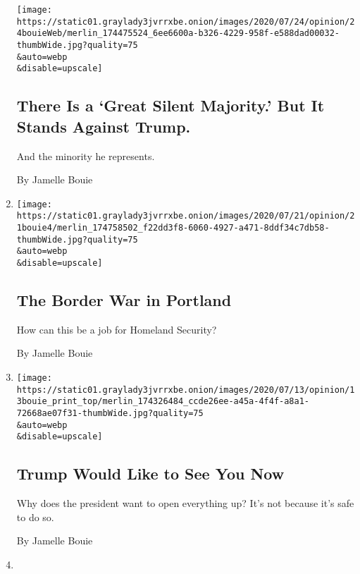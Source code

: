 \begin{enumerate}
  \texttt{[image: https://static01.graylady3jvrrxbe.onion/images/2020/07/24/opinion/24bouieWeb/merlin\_174475524\_6ee6600a-b326-4229-958f-e588dad00032-thumbWide.jpg?quality=75\\\&auto=webp\\\&disable=upscale]}

  \hypertarget{there-is-a-great-silent-majority-but-it-stands-against-trump}{%
  \subsection{There Is a `Great Silent Majority.' But It Stands Against
  Trump.}\label{there-is-a-great-silent-majority-but-it-stands-against-trump}}

  And the minority he represents.

  By Jamelle Bouie
\item
  \href{/2020/07/21/opinion/portland-homeland-security.html}{}

  \texttt{[image: https://static01.graylady3jvrrxbe.onion/images/2020/07/21/opinion/21bouie4/merlin\_174758502\_f22dd3f8-6060-4927-a471-8ddf34c7db58-thumbWide.jpg?quality=75\\\&auto=webp\\\&disable=upscale]}

  \hypertarget{the-border-war-in-portland}{%
  \subsection{The Border War in
  Portland}\label{the-border-war-in-portland}}

  How can this be a job for Homeland Security?

  By Jamelle Bouie
\item
  \href{/2020/07/10/opinion/trump-schools-reopening.html}{}

  \texttt{[image: https://static01.graylady3jvrrxbe.onion/images/2020/07/13/opinion/13bouie\_print\_top/merlin\_174326484\_ccde26ee-a45a-4f4f-a8a1-72668ae07f31-thumbWide.jpg?quality=75\\\&auto=webp\\\&disable=upscale]}

  \hypertarget{trump-would-like-to-see-you-now}{%
  \subsection{Trump Would Like to See You
  Now}\label{trump-would-like-to-see-you-now}}

  Why does the president want to open everything up? It's not because
  it's safe to do so.

  By Jamelle Bouie
\item
  \href{/2020/07/07/opinion/trump-mount-rushmore-culture-war.html}{}


\end{enumerate}
